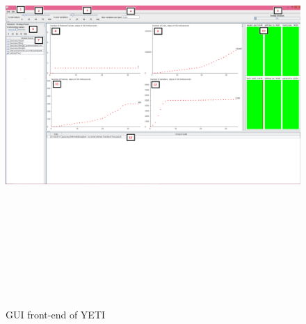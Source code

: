 
\begin{figure}
\centering
\centerline{\includegraphics[width=24cm,height=16cm]{chapter3/yetiGUI.png}}
\caption{GUI front-end of YETI}
\label{fig:yetiGUI_3}
\end{figure}



